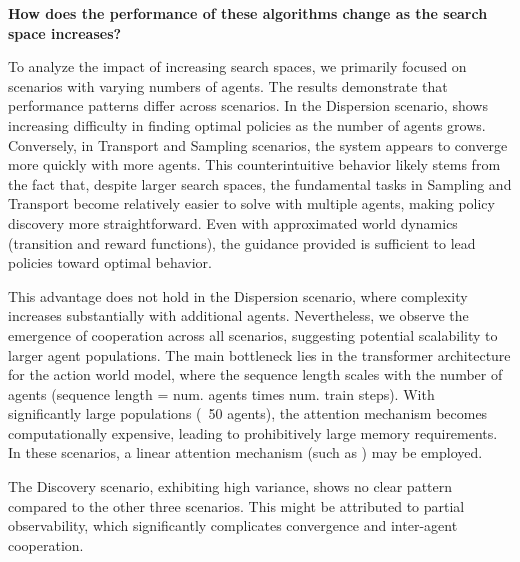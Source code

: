 \begin{center}
 \textbf{How does the performance of these algorithms change as the search space increases?}
\end{center}
To analyze the impact of increasing search spaces, we primarily focused on scenarios with varying numbers of agents. The results demonstrate that performance patterns differ across scenarios. In the Dispersion scenario, \fname{} shows increasing difficulty in finding optimal policies as the number of agents grows. Conversely, in Transport and Sampling scenarios, the system appears to converge more quickly with more agents. This counterintuitive behavior likely stems from the fact that, despite larger search spaces, the fundamental tasks in Sampling and Transport become relatively easier to solve with multiple agents, making policy discovery more straightforward. Even with approximated world dynamics (transition and reward functions), the guidance provided is sufficient to lead policies toward optimal behavior.

This advantage does not hold in the Dispersion scenario, where complexity increases substantially with additional agents. Nevertheless, we observe the emergence of cooperation across all scenarios, suggesting potential scalability to larger agent populations. The main bottleneck lies in the transformer architecture for the action world model, where the sequence length scales with the number of agents (sequence length = num. agents times num. train steps). With significantly large populations (~50 agents), the attention mechanism becomes computationally expensive, leading to prohibitively large memory requirements. In these scenarios, a linear attention mechanism (such as \cite{Beltagy20}) may be employed.

The Discovery scenario, exhibiting high variance, shows no clear pattern compared to the other three scenarios.
This might be attributed to partial observability, which significantly complicates convergence and inter-agent cooperation.
